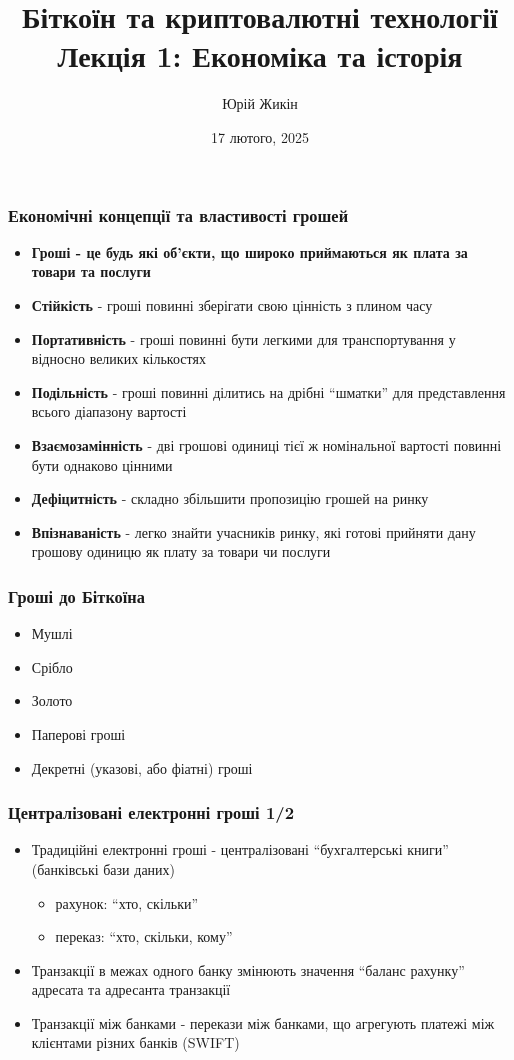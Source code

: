 \documentclass{beamer}
\title{
  Біткоїн та криптовалютні технології \\
  Лекція 1: Економіка та історія
}
\author{Юрій Жикін}
\date{17 лютого, 2025}
\begin{document}
\frame{\titlepage}

\begin{frame}
  \frametitle{Економічні концепції та властивості грошей}
  \begin{itemize}
  \item \textbf{Гроші - це будь які об'єкти, що широко приймаються як плата за
      товари та послуги}
  \item \textbf{Стійкість} - гроші повинні зберігати свою цінність з плином часу
  \item \textbf{Портативність} - гроші повинні бути легкими для транспортування
    у відносно великих кількостях
  \item \textbf{Подільність} - гроші повинні ділитись на дрібні ``шматки'' для
    представлення всього діапазону вартості
  \item \textbf{Взаємозамінність} - дві грошові одиниці тієї ж номінальної
    вартості повинні бути однаково цінними
  \item \textbf{Дефіцитність} - складно збільшити пропозицію грошей на ринку
  \item \textbf{Впізнаваність} - легко знайти учасників ринку, які готові
    прийняти дану грошову одиницю як плату за товари чи послуги
  \end{itemize}
\end{frame}

\begin{frame}
  \frametitle{Гроші до Біткоїна}
  \begin{itemize}
  \item Мушлі
  \item Срібло
  \item Золото
  \item Паперові гроші
  \item Декретні (указові, або фіатні) гроші
  \end{itemize}
\end{frame}

\begin{frame}
  \frametitle{Централізовані електронні гроші 1/2}
  \begin{itemize}
  \item Традиційні електронні гроші - централізовані ``бухгалтерські книги''
    (банківські бази даних)
    \begin{itemize}
    \item рахунок: ``хто, скільки''
    \item переказ: ``хто, скільки, кому''
    \end{itemize}
  \item Транзакції в межах одного банку змінюють значення ``баланс рахунку''
    адресата та адресанта транзакції
  \item Транзакції між банками - перекази між банками, що агрегують платежі між
    клієнтами різних банків (SWIFT)
  \end{itemize}
  
\end{frame}
\end{document}
